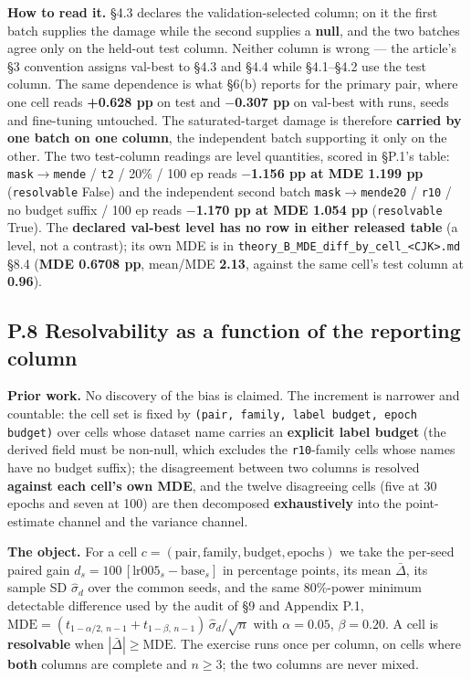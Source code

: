 \documentclass[pdflatex,sn-mathphys-ay]{sn-jnl}
\begin{document}
\textbf{How to read it.} \S{}4.3 declares the validation-selected column; on it the first batch supplies the damage while the second supplies a \textbf{null}, and the two batches agree only on the held-out test column. Neither column is wrong --- the article's \S{}3 convention assigns val-best to \S{}4.3 and \S{}4.4 while \S{}4.1--\S{}4.2 use the test column. The same dependence is what \S{}6(b) reports for the primary pair, where one cell reads \textbf{+0.628 pp} on test and \textbf{\ensuremath{-}0.307 pp} on val-best with runs, seeds and fine-tuning untouched. The saturated-target damage is therefore \textbf{carried by one batch on one column}, the independent batch supporting it only on the other. The two test-column readings are level quantities, scored in \S{}P.1's table: \texttt{mask\ensuremath{\rightarrow}mende} / \texttt{t2} / 20\% / 100 ep reads \textbf{\ensuremath{-}1.156 pp at MDE 1.199 pp} (\texttt{resolvable} False) and the independent second batch \texttt{mask\ensuremath{\rightarrow}mende20} / \texttt{r10} / no budget suffix / 100 ep reads \textbf{\ensuremath{-}1.170 pp at MDE 1.054 pp} (\texttt{resolvable} True). The \textbf{declared val-best level has no row in either released table} (a level, not a contrast); its own MDE is in \texttt{theory\_B\_MDE\_diff\_by\_cell\_<CJK>.md} \S{}8.4 (\textbf{MDE 0.6708 pp}, \textbar{}mean\textbar{}/MDE \textbf{2.13}, against the same cell's test column at \textbf{0.96}).

\subsection*{P.8 Resolvability as a function of the reporting column}

\textbf{Prior work.} No discovery of the bias is claimed. The increment is narrower and countable: the cell set is fixed by \texttt{(pair, family, label budget, epoch budget)} over cells whose dataset name carries an \textbf{explicit label budget} (the derived field must be non-null, which excludes the \texttt{r10}-family cells whose names have no budget suffix); the disagreement between two columns is resolved \textbf{against each cell's own MDE}, and the twelve disagreeing cells (five at 30 epochs and seven at 100) are then decomposed \textbf{exhaustively} into the point-estimate channel and the variance channel.

\textbf{The object.} For a cell $c=(\text{pair},\text{family},\text{budget},\text{epochs})$ we take the per-seed paired gain $d_s = 100\,[\text{lr005}_s-\text{base}_s]$ in percentage points, its mean $\bar\Delta$, its sample SD $\hat\sigma_d$ over the common seeds, and the same 80\%-power minimum detectable difference used by the audit of \S{}9 and Appendix P.1, $\mathrm{MDE} = (t_{1-\alpha/2,\,n-1}+t_{1-\beta,\,n-1})\,\hat\sigma_d/\sqrt n$ with $\alpha=0.05$, $\beta=0.20$. A cell is \textbf{resolvable} when $|\bar\Delta|\ge\mathrm{MDE}$. The exercise runs once per column, on cells where \textbf{both} columns are complete and $n\ge 3$; the two columns are never mixed.
\end{document}
